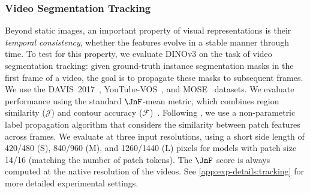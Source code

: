 \subsubsection{Video Segmentation Tracking}
\label{sec:results-tracking}

Beyond static images, an important property of visual representations is their \emph{temporal consistency}, \ie whether the features evolve in a stable manner through time.
To test for this property, we evaluate DINOv3 on the task of video segmentation tracking: given ground-truth instance segmentation masks in the first frame of a video, the goal is to propagate these masks to subsequent frames.
We use the DAVIS~2017~\citep{pont20172017}, YouTube-VOS~\citep{xu2018youtubevos}, and MOSE~\citep{ding2023mose} datasets.
We evaluate performance using the standard \(\JnF\)-mean metric, which combines region similarity (\(\mathcal{J}\)) and contour accuracy (\(\mathcal{F}\))~\citep{perazzi2016benchmark}.
Following \citet{jabri2020space}, we use a non-parametric label propagation algorithm that considers the similarity between patch features across frames.
We evaluate at three input resolutions, using a short side length of 420/480 (S), 840/960 (M), and 1260/1440 (L) pixels for models with patch size 14/16 (matching the number of patch tokens).
The \(\JnF\) score is always computed at the native resolution of the videos.
See \cref{app:exp-details:tracking} for more detailed experimental settings.

